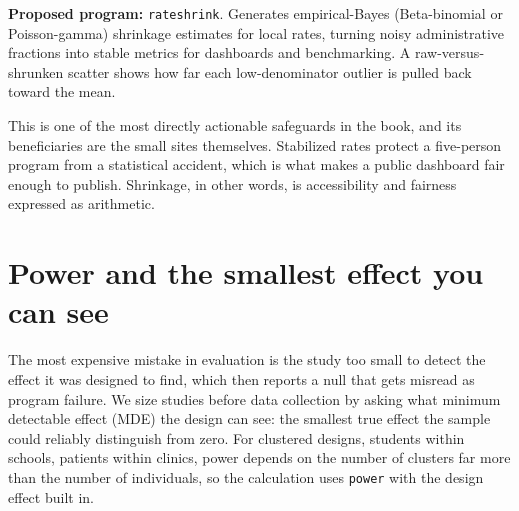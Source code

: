 \documentclass[
    a4paper,
    fontsize=10pt,
    twoside=true,
    numbers=noenddot,
]{kaobook}
\begin{document}
\begin{kaobox}[frametitle=Ado-file Idea: \texttt{rateshrink}]
\textbf{Proposed program:} \texttt{rateshrink}. Generates empirical-Bayes (Beta-binomial or Poisson-gamma) shrinkage estimates for local rates, turning noisy administrative fractions into stable metrics for dashboards and benchmarking. A raw-versus-shrunken scatter shows how far each low-denominator outlier is pulled back toward the mean.
\end{kaobox}

This is one of the most directly actionable safeguards in the book, and its beneficiaries are the small sites themselves. Stabilized rates protect a five-person program from a statistical accident, which is what makes a public dashboard fair enough to publish. Shrinkage, in other words, is accessibility and fairness expressed as arithmetic.

\section{Power and the smallest effect you can see}\label{sec:mde}
The most expensive mistake in evaluation is the study too small to detect the effect it was designed to find, which then reports a null that gets misread as program failure. We size studies before data collection by asking what minimum detectable effect (MDE) the design can see: the smallest true effect the sample could reliably distinguish from zero. For clustered designs, students within schools, patients within clinics, power depends on the number of clusters far more than the number of individuals, so the calculation uses \texttt{power} with the design effect built in.
\end{document}
